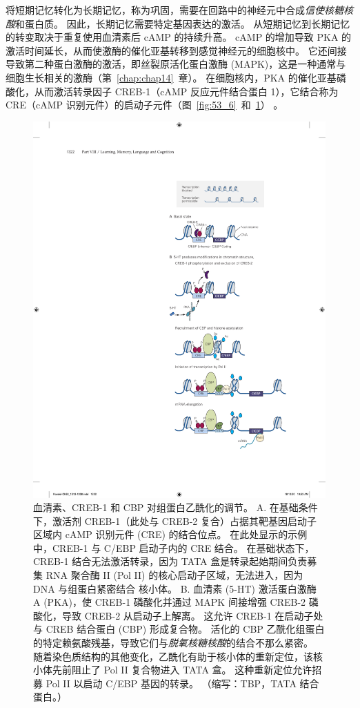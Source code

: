 将短期记忆转化为长期记忆，称为巩固，需要在回路中的神经元中合成\textit{信使核糖核酸}和蛋白质。
因此，长期记忆需要特定基因表达的激活。
从短期记忆到长期记忆的转变取决于重复使用血清素后 cAMP 的持续升高。
cAMP 的增加导致 PKA 的激活时间延长，从而使激酶的催化亚基转移到感觉神经元的细胞核中。
它还间接导致第二种蛋白激酶的激活，即丝裂原活化蛋白激酶 (MAPK)，这是一种通常与细胞生长相关的激酶（第~\ref{chap:chap14}~章）。
在细胞核内，PKA 的催化亚基磷酸化，从而激活转录因子 CREB-1（cAMP 反应元件结合蛋白 1），它结合称为 CRE（cAMP 识别元件）的启动子元件（图~\ref{fig:53_6}~和~\ref{fig:53_7}） 。


\begin{figure}[htbp]
	\centering
	\includegraphics[width=0.6\linewidth]{chap53/fig_53_7}
	\caption{血清素、CREB-1 和 CBP 对组蛋白乙酰化的调节。 A. 在基础条件下，激活剂 CREB-1（此处与 CREB-2 复合）占据其靶基因启动子区域内 cAMP 识别元件 (CRE) 的结合位点。 在此处显示的示例中，CREB-1 与 C/EBP 启动子内的 CRE 结合。 在基础状态下，CREB-1 结合无法激活转录，因为 TATA 盒是转录起始期间负责募集 RNA 聚合酶 II (Pol II) 的核心启动子区域，无法进入，因为 DNA 与组蛋白紧密结合 核小体。 B. 血清素 (5-HT) 激活蛋白激酶 A (PKA)，使 CREB-1 磷酸化并通过 MAPK 间接增强 CREB-2 磷酸化，导致 CREB-2 从启动子上解离。 这允许 CREB-1 在启动子处与 CREB 结合蛋白 (CBP) 形成复合物。 活化的 CBP 乙酰化组蛋白的特定赖氨酸残基，导致它们与\textit{脱氧核糖核酸}的结合不那么紧密。 随着染色质结构的其他变化，乙酰化有助于核小体的重新定位，该核小体先前阻止了 Pol II 复合物进入 TATA 盒。 这种重新定位允许招募 Pol II 以启动 C/EBP 基因的转录。 （缩写：TBP，TATA 结合蛋白。）}
	\label{fig:53_7}
\end{figure}


